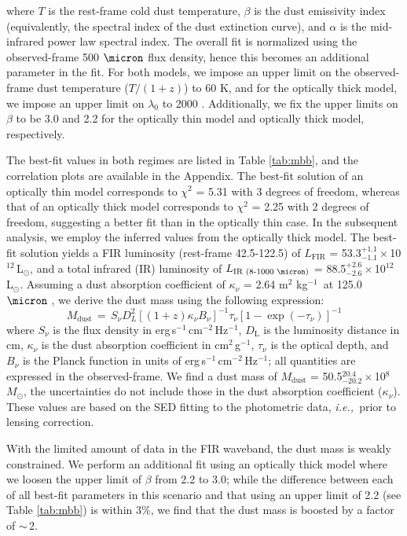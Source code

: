 \documentclass[twocolumn,apj,numberedappendix]{emulateapj}
\newcommand{\Msun}{\mbox{$M_{\odot}$}}
\newcommand{\Lsun}{\mbox{L$_{\odot}$}}
\newcommand{\ie}{{\sl i.e.,~}}
\newcommand{\pmOne}{\mbox{$^{-1}$}}
\begin{document}
where $T$ is the rest-frame cold dust temperature, $\beta$ is the dust emissivity index (equivalently, the spectral index of the dust extinction
curve), and $\alpha$ is the mid-infrared power law spectral index. The overall fit is normalized using the observed-frame 500
$\micron$ flux density, hence this becomes an additional parameter in the fit. For both models, we impose an upper limit on the observed-frame dust temperature ($T/(1+z)$) to 60 K, and for the optically thick model, we impose an upper limit on $\lambda_0$ to 2000\,\,\micron. Additionally, we fix the upper limits on
$\beta$ to be 3.0 and 2.2 for the optically thin model and optically thick model, respectively.


The best-fit values in both regimes are listed in Table \ref{tab:mbb}, and the correlation plots are available in the Appendix. The best-fit solution of an optically thin
model corresponds to $\chi^2$ = 5.31 with 3 degrees of freedom, whereas that of an optically thick model
corresponds to $\chi^2$ = 2.25 with 2 degrees of freedom, suggesting a better fit than in the optically thin
case. In the subsequent analysis, we employ the inferred values from the optically thick model.
The best-fit solution yields a FIR luminosity (rest-frame 42.5-122.5\micron) of $L_\textrm{FIR}$ = 53.3$^{+1.1}_{-1.1}$\,$\times$\,10$^{12}$\,\Lsun, and a total infrared (IR) luminosity of $L_\textrm{IR (8-1000 \micron)}$ = 88.5$^{+2.6}_{-2.6}$\,$\times$\,10$
^{12}$\,\Lsun. Assuming a dust absorption coefficient of $\kappa_{\nu}$ = 2.64\,\,m$^2$\,\,kg\pmOne\ at 125.0\,\,$
\micron$ \citep{Dunne03a}, we derive the dust mass using the following expression:
\begin{equation}
M_\textrm{dust}\,=\,S_{\nu} D_{L}^2 [(1 + z) \kappa_{\nu} B_{\nu}]^{-1} \tau_{\nu} [1-
\exp(-\tau_{\nu})]^{-1}
\end{equation}
where $S_{\nu}$ is the flux density in erg\,s\pmOne\,cm$^{-2}$\,Hz\pmOne, $D_\textrm{L}$ is the luminosity distance in cm, $\kappa_{\nu}$ is the dust
absorption coefficient in cm$^2$\,g\pmOne, $\tau_{\nu}$ is the optical depth, and $B_{\nu}$ is the Planck function in units of erg\,s\pmOne\,cm$^{-2}$\,Hz\pmOne;
all quantities are expressed in the observed-frame. We find a dust mass of $M_\textrm{dust}$ = 50.5$^{20.4}_{-20.2}\times$10$^8$\,\,\Msun, the uncertainties do not include those in the dust absorption coefficient ($\kappa_{\nu}$). These values are based on the SED fitting to the photometric data, \ie prior
to lensing correction.

With the limited amount of data in the FIR waveband, the dust mass is weakly constrained.
We perform an additional fit using an optically thick model where we loosen the upper limit of $\beta$ from 2.2 to 3.0; while the difference between each of all best-fit parameters in this scenario and that using an upper limit of 2.2 (see Table \ref{tab:mbb}) is within 3\%, we find that the dust mass is boosted by a factor of $\sim$\,2.
\end{document}
